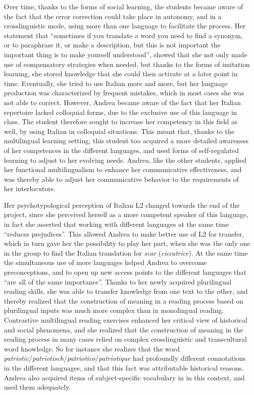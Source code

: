 \documentclass[output=paper]{../langscibook}
\begin{document}
Over time, thanks to the forms of social learning, the students became aware of the fact that the error correction could take place in autonomy, and in a crosslinguistic mode, using more than one language to facilitate the process. Her statement that “sometimes if you translate a word you need to find a synonym, or to paraphrase it, or make a description, but this is not important the important thing is to make yourself understood”, showed that she not only made use of compensatory strategies when needed, but thanks to the forms of imitation learning, she stored knowledge that she could then activate at a later point in time. Eventually, she tried to use Italian more and more, but her language production was characterized by frequent mistakes, which in most cases she was not able to correct. However, Andrea became aware of the fact that her Italian repertoire lacked colloquial forms, due to the exclusive use of this language in class. The student therefore sought to increase her competency in this field as well, by using Italian in colloquial situations. This meant that, thanks to the multilingual learning setting, this student too acquired a more detailed awareness of her competences in the different languages, and used forms of self-regulated learning to adjust to her evolving needs. Andrea, like the other students, applied her functional multilingualism to enhance her communicative effectiveness, and was thereby able to adjust her communicative behavior to the requirements of her interlocutors. 

Her psychotypological perception of Italian L2 changed towards the end of the project, since she perceived herself as a more competent speaker of this language, in fact she asserted that working with different languages at the same time “reduces prejudices”. This allowed Andrea to make better use of L2 for transfer, which in turn gave her the possibility to play her part, when she was the only one in the group to find the Italian translation for \textit{scar} (\textit{ciccatrice}). At the same time the simultaneous use of more languages helped Andrea to overcome preconceptions, and to open up new access points to the different languages that “are all of the same importance”. Thanks to her newly acquired plurilingual reading skills, she was able to transfer knowledge from one text to the other, and thereby realized that the construction of meaning in a reading process based on plurilingual inputs was much more complex than in monolingual reading. Contrastive multilingual reading exercises enhanced her critical view of historical and social phenomena, and she realized that the construction of meaning in the reading process in many cases relied on complex crosslinguistic and transcultural word knowledge. So for instance she realizes that the word \emph{patriotic}\slash\emph{patriotisch}\slash\emph{patriotico}\slash\emph{patriotique} had profoundly different connotations in the different languages, and that this fact was attributable historical reasons. Andrea also acquired items of subject-specific vocabulary in in this context, and used them adequately. 
\end{document}
